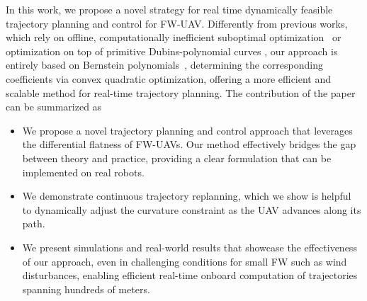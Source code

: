 In this work, we propose a novel strategy for real time dynamically feasible trajectory planning and control for FW-UAV. 
Differently from previous works, which rely on offline, computationally inefficient suboptimal optimization~\cite{Guozheng} or optimization on top of primitive Dubins-polynomial curves \cite{LugoCrdenas2014DubinsPG}, our approach is entirely based on Bernstein polynomials~\cite{kielas2022bernstein}, determining the corresponding coefficients via convex quadratic optimization, offering a more efficient and scalable method for real-time trajectory planning. The contribution of the paper can be summarized as
\begin{itemize}
\item We propose a novel trajectory planning and control approach that leverages the differential flatness of FW-UAVs. Our method effectively bridges the gap between theory and practice, providing a clear formulation that can be implemented on real robots.

\item We demonstrate continuous trajectory replanning, which we show is helpful to dynamically adjust the curvature constraint as the UAV advances along its path.

\item We present simulations and real-world results that showcase the effectiveness of our approach, even in challenging conditions for small FW such as wind disturbances, enabling efficient real-time onboard computation of trajectories spanning hundreds of meters.


\end{itemize}


